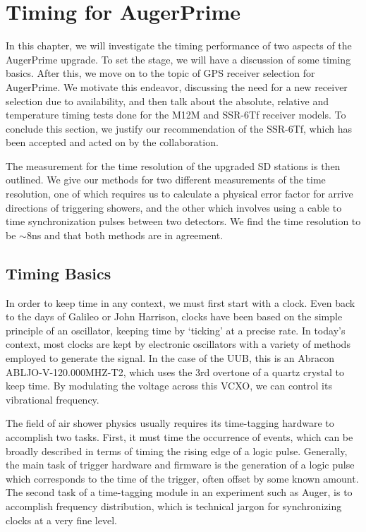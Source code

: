 
\chapter{Timing for AugerPrime}
\label{augtiming}
In this chapter, we will investigate the timing performance of two aspects of the AugerPrime upgrade. To set the stage, we will have a discussion of some timing basics. After this, we move on to the topic of GPS receiver selection for AugerPrime. We motivate this endeavor, discussing the need for a new receiver selection due to availability, and then talk about the absolute, relative and temperature timing tests done for the M12M and SSR-6Tf receiver models. To conclude this section, we justify our recommendation of the SSR-6Tf, which has been accepted and acted on by the collaboration. 

The measurement for the time resolution of the upgraded SD stations is then outlined. We give our methods for two different measurements of the time resolution, one of which requires us to calculate a physical error factor for arrive directions of triggering showers, and the other which involves using a cable to time synchronization pulses between two detectors. We find the time resolution to be $\sim$8ns and that both methods are in agreement. 
\section{Timing Basics}
In order to keep time in any context, we must first start with a clock. Even back to the days of Galileo or John Harrison, clocks have been based on the simple principle of an oscillator, keeping time by `ticking' at a precise rate. In today's context, most clocks are kept by electronic oscillators with a variety of methods employed to generate the signal. In the case of the UUB, this is an Abracon ABLJO-V-120.000MHZ-T2, which uses the 3rd overtone of a quartz crystal to keep time. By modulating the voltage across this VCXO, we can control its vibrational frequency. 

The field of air shower physics usually requires its time-tagging hardware to accomplish two tasks. First, it must time the occurrence of events, which can be broadly described in terms of timing the rising edge of a logic pulse. Generally, the main task of trigger hardware and firmware is the generation of a logic pulse which corresponds to the time of the trigger, often offset by some known amount. The second task of a time-tagging module in an experiment such as Auger, is to accomplish frequency distribution, which is technical jargon for synchronizing clocks at a very fine level.

